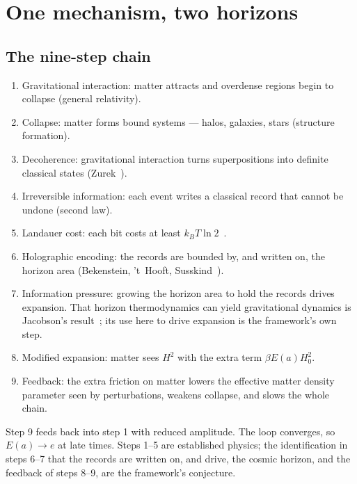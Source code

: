 \chapter{One mechanism, two horizons}\label{ch:theoryinterp}

\section{The nine-step chain}
\begin{enumerate}
\item Gravitational interaction: matter attracts and overdense regions begin to collapse (general relativity).
\item Collapse: matter forms bound systems --- halos, galaxies, stars (structure formation).
\item Decoherence: gravitational interaction turns superpositions into definite classical states (Zurek~\cite{Zurek2003}).
\item Irreversible information: each event writes a classical record that cannot be undone (second law).
\item Landauer cost: each bit costs at least $k_BT\ln2$~\cite{Landauer1961}.
\item Holographic encoding: the records are bounded by, and written on, the horizon area (Bekenstein, 't~Hooft, Susskind~\cite{Bekenstein1973,tHooft1993,Susskind1995}).
\item Information pressure: growing the horizon area to hold the records drives expansion. That horizon thermodynamics can yield gravitational dynamics is Jacobson's result~\cite{Jacobson1995}; its use here to drive expansion is the framework's own step.
\item Modified expansion: matter sees $H^2$ with the extra term $\beta E(a)H_0^2$.
\item Feedback: the extra friction on matter lowers the effective matter density parameter seen by perturbations, weakens collapse, and slows the whole chain.
\end{enumerate}
Step 9 feeds back into step 1 with reduced amplitude. The loop converges, so $E(a)\to e$ at late times. Steps 1--5 are established physics; the
identification in steps 6--7 that the records are written on, and drive, the cosmic horizon, and the feedback of steps 8--9, are the framework's
conjecture. \conjecture

